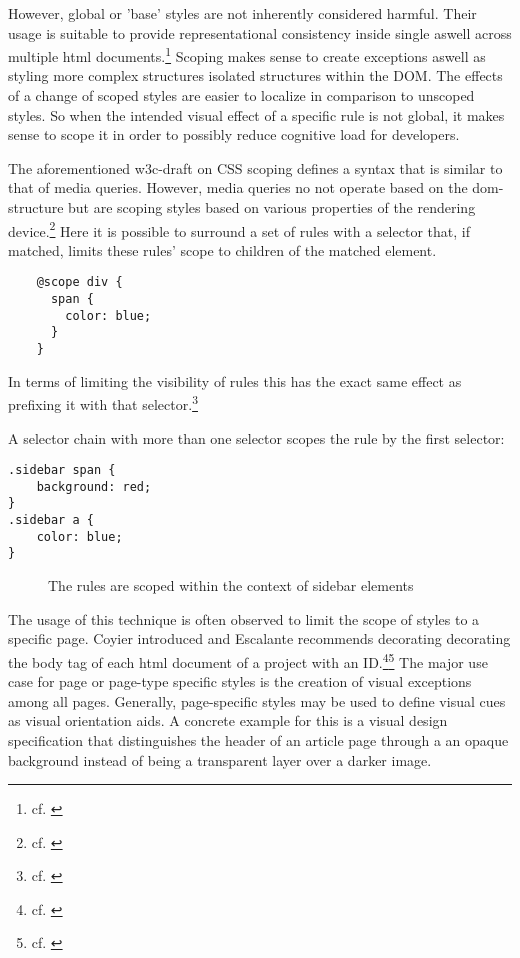 However, global or 'base' styles are not inherently considered harmful.
Their usage is suitable to provide representational consistency inside single aswell across multiple \gls{html} documents.\footnote{cf. \cite{mpgcss}}
Scoping makes sense to create exceptions aswell as styling more complex structures isolated structures within the DOM.
The effects of a change of scoped styles are easier to localize in comparison to unscoped styles.
So when the intended visual effect of a specific rule is not global, it makes sense to scope it in order to possibly reduce cognitive load for developers.

The aforementioned \gls{w3c}-draft on CSS scoping defines a syntax that is similar to that of media queries.
However, media queries no not operate based on the \gls{dom}-structure but are scoping styles based on various properties of the rendering device.\footnote{cf. \cite{mediaqueries}}
Here it is possible to surround a set of rules with a selector that, if matched, limits these rules' scope to children of the matched element.
\begin{verbatim}
    @scope div {
      span {
        color: blue;
      }
    }
\end{verbatim}
In terms of limiting the visibility of rules this has the exact same effect as prefixing it with that selector.\footnote{cf. \cite{cssscopingmodule}}

A selector chain with more than one selector scopes the rule by the first selector:
\begin{verbatim}
.sidebar span {
    background: red;
}
.sidebar a {
    color: blue;
}
\end{verbatim}
\begin{figure}
\caption{The rules are scoped within the context of sidebar elements}
\end{figure}

The usage of this technique is often observed to limit the scope of styles to a specific page.
Coyier introduced and Escalante recommends decorating decorating the body tag of each \gls{html} document of a project with an ID.\footnote{cf. \cite{coyieridbody}}\footnote{cf. \cite{mpgcss}}
The major use case for page or page-type specific styles is the creation of visual exceptions among all pages.
Generally, page-specific styles may be used to define visual cues as visual orientation aids.
A concrete example for this is a visual design specification that distinguishes the header of an article page through a an opaque background instead of being  a transparent layer over a darker image.

